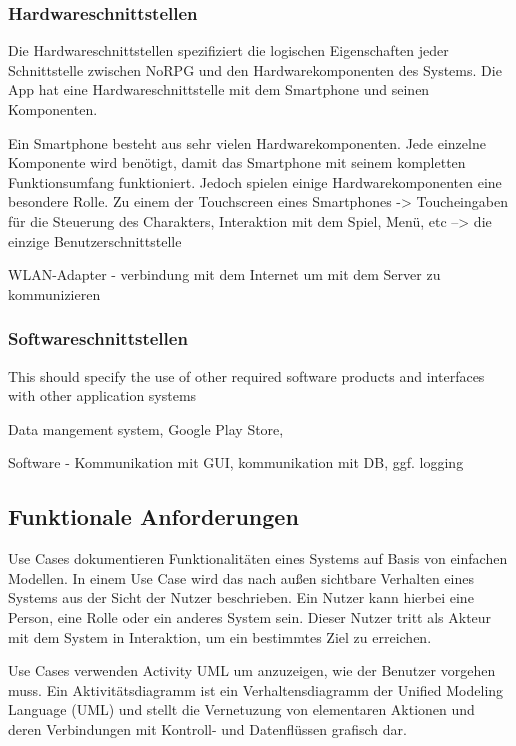 		\subsubsection{Hardwareschnittstellen}
			Die Hardwareschnittstellen spezifiziert die logischen Eigenschaften jeder Schnittstelle zwischen NoRPG und den Hardwarekomponenten des Systems. Die App hat eine  Hardwareschnittstelle mit dem Smartphone und seinen Komponenten.
			
			Ein Smartphone besteht aus sehr vielen Hardwarekomponenten. Jede einzelne Komponente wird benötigt, damit das Smartphone mit seinem kompletten Funktionsumfang funktioniert. Jedoch spielen einige Hardwarekomponenten eine besondere Rolle. Zu einem der Touchscreen eines Smartphones -> Toucheingaben für die Steuerung des Charakters, Interaktion mit dem Spiel, Menü, etc --> die einzige Benutzerschnittstelle
			
			WLAN-Adapter - verbindung mit dem Internet um mit dem Server zu kommunizieren
			
		\subsubsection{Softwareschnittstellen}
			This should specify the use of other required software products and interfaces with other application systems 
			
			Data mangement system, Google Play Store, 
			
			Software - Kommunikation mit GUI, kommunikation mit DB, ggf. logging

	\subsection{Funktionale Anforderungen}
		Use Cases dokumentieren Funktionalitäten eines Systems auf Basis von einfachen Modellen. In einem Use Case wird das nach außen sichtbare Verhalten eines Systems aus der Sicht der Nutzer beschrieben. Ein Nutzer kann hierbei eine Person, eine Rolle oder ein anderes System sein. Dieser Nutzer tritt als Akteur mit dem System in Interaktion, um ein bestimmtes Ziel zu erreichen. %
		
		Use Cases verwenden Activity UML um anzuzeigen, wie der Benutzer vorgehen muss. Ein Aktivitätsdiagramm ist ein Verhaltensdiagramm der Unified Modeling Language (UML) und stellt die Vernetuzung von elementaren Aktionen und deren Verbindungen mit Kontroll- und Datenflüssen grafisch dar.
	
